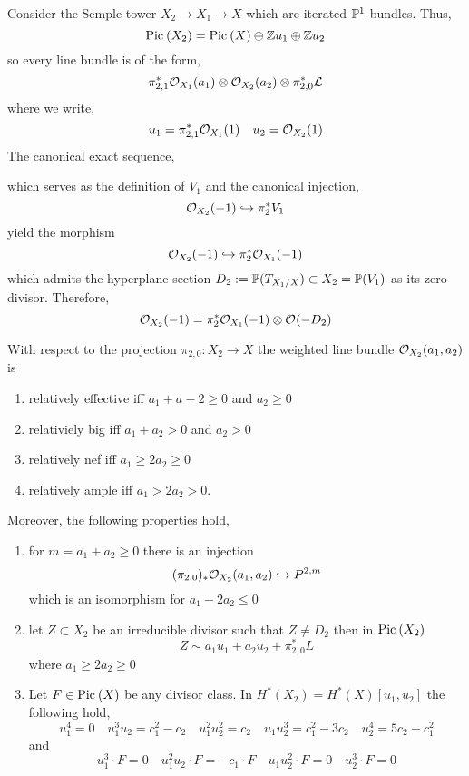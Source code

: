 \documentclass[12pt]{article}
\begin{document}
Consider the Semple tower $X_2 \to X_1 \to X$ which are iterated $\P^1$-bundles. Thus,
\[ \Pic{X_2} = \Pic{X} \oplus \Z u_1 \oplus \Z u_2 \]
so every line bundle is of the form,
\[ \pi_{2,1}^* \struct{X_1}(a_1) \ot \struct{X_2}(a_2) \ot \pi_{2,0}^* \L \]
where we write,
\[ u_1 = \pi_{2,1}^* \struct{X_1}(1) \quad u_2 = \struct{X_2}(1) \]
The canonical exact sequence,
\begin{center}
\end{center}
which serves as the definition of $V_1$ and the canonical injection,
\[ \struct{X_2}(-1) \embed \pi_2^* V_1 \]
yield the morphism
\[ \struct{X_2}(-1) \embed \pi_2^* \struct{X_1}(-1) \]
which admits the hyperplane section $D_2 := \P(T_{X_1/X}) \subset X_2 = \P(V_1)$ as its zero divisor. Therefore,
\[ \struct{X_2}(-1) = \pi_2^* \struct{X_1}(-1) \ot \struct{}(-D_2) \]

\begin{lemma}
With respect to the projection $\pi_{2,0} : X_2 \to X$ the weighted line bundle $\struct{X_2}(a_1, a_2)$ is
\begin{enumerate}
\item relatively effective iff $a_1 + a-2 \ge 0$ and $a_2 \ge 0$
\item relativiely big iff $a_1 + a_2 > 0$ and $a_2 > 0$
\item relatively nef iff $a_1 \ge 2 a_2 \ge 0$
\item relatively ample iff $a_1 > 2 a_2 > 0$.
\end{enumerate}
Moreover, the following properties hold,
\begin{enumerate}
\item for $m = a_1 + a_2 \ge 0$ there is an injection
\[ (\pi_{2,0})_* \struct{X_2}(a_1, a_2) \embed P^{2,m} \]
which is an isomorphism for $a_1 - 2 a_2 \le 0$
\item let $Z \subset X_2$ be an irreducible divisor such that $Z \neq D_2$ then in $\Pic{X_2}$ 
\[ Z \sim a_1 u_1 + a_2 u_2 + \pi_{2,0}^* L \]
where $a_1 \ge 2 a_2 \ge 0$
\item Let $F \in \Pic{X}$ be any divisor class. In $H^*(X_2) = H^*(X)[u_1, u_2]$ the following hold,
\[ u_1^4 = 0 \quad u_1^3 u_2 = c_1^2 - c_2 \quad u_1^2 u_2^2 = c_2 \quad u_1 u_2^3 = c_1^2 - 3 c_2 \quad u_2^4 = 5 c_2 - c_1^2 \]
and 
\[ u_1^3 \cdot F = 0 \quad u_1^2 u_2 \cdot F = - c_1 \cdot F \quad u_1 u_2^2 \cdot F = 0 \quad u_2^3 \cdot F = 0 \]
\end{enumerate}
\end{lemma}
\end{document}
